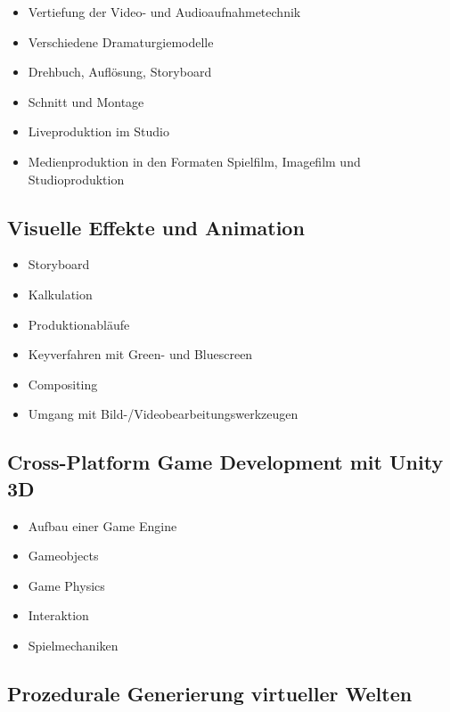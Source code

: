 \begin{itemize}
\tightlist
\item
  Vertiefung der Video- und Audioaufnahmetechnik
\item
  Verschiedene Dramaturgiemodelle
\item
  Drehbuch, Auflösung, Storyboard
\item
  Schnitt und Montage
\item
  Liveproduktion im Studio
\item
  Medienproduktion in den Formaten Spielfilm, Imagefilm und
  Studioproduktion
\end{itemize}

\subsection*{Visuelle Effekte und
Animation}\label{visuelle-effekte-und-animation-1}

\begin{itemize}
\tightlist
\item
  Storyboard
\item
  Kalkulation
\item
  Produktionabläufe
\item
  Keyverfahren mit Green- und Bluescreen
\item
  Compositing
\item
  Umgang mit Bild-/Videobearbeitungswerkzeugen
\end{itemize}

\subsection*{Cross-Platform Game Development mit Unity
3D}\label{cross-platform-game-development-mit-unity-3d-1}

\begin{itemize}
\tightlist
\item
  Aufbau einer Game Engine
\item
  Gameobjects
\item
  Game Physics
\item
  Interaktion
\item
  Spielmechaniken
\end{itemize}

\subsection*{Prozedurale Generierung virtueller
Welten}\label{prozedurale-generierung-virtueller-welten-1}

